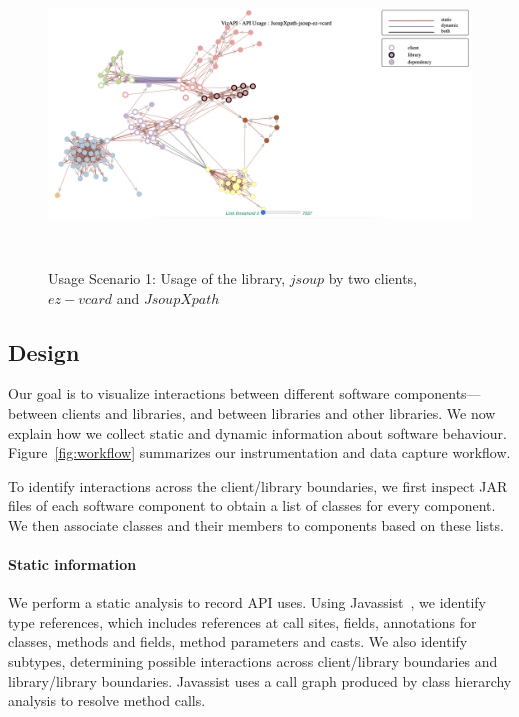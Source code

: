 \begin{figure}[h]
\begin{center}
\includegraphics[scale=1,width=15cm,height=8cm]{images/usage-scenario1.png}
\caption{Usage Scenario 1: Usage of the library, $jsoup$ by two clients, $ez-vcard$  and $JsoupXpath$}
\label{fig:usagescenario1}
\end{center}
\end{figure}

\subsection{Design}
\label{subsec:collecting-data}
Our goal is to visualize interactions between different software components---between
clients and libraries, and between libraries and other libraries. We now explain
how we collect static and dynamic information about software behaviour.
Figure~\ref{fig:workflow} summarizes our instrumentation and
data capture workflow. 

To identify interactions across the client/library boundaries,
we first inspect JAR files of each software component to obtain a list of
classes for every component. We then associate classes and their members to
components based on these lists.

\paragraph{Static information} We perform a static analysis to record
API uses. Using Javassist~\cite{chiba00:_load_struc_reflec_java}, we identify type
references, which includes references at call sites, fields, annotations for 
classes, methods and fields, method parameters and casts. 
We also identify subtypes, determining possible 
interactions across client/library boundaries and library/library boundaries.
Javassist uses
a call graph produced by class hierarchy analysis to resolve method calls.

